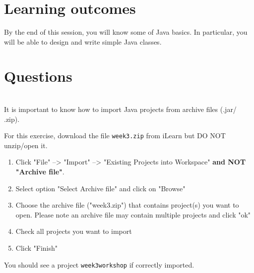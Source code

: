 \section*{Learning outcomes}

By the end of this session, you will know some of Java basics.
In particular, you will be able to design and write simple Java classes.

\section*{Questions}

\begin{questions}

\\
 
It is important to know how to import Java projects from archive files (.jar/ .zip).

For this exercise, download the file \texttt{week3.zip} from iLearn but \color{red}DO NOT unzip/open it\color{black}.

\begin{enumerate}
\item Click "File" --> "Import" --> "Existing Projects into Workspace" \color{red}\textbf{and NOT "Archive file"}\color{black}.
\item Select option "Select Archive file" and click on "Browse"
\item Choose the archive file ("week3.zip") that contains project(s) you want to open. Please note an archive file may contain multiple projects and click "ok"
\item Check all projects you want to import
\item Click "Finish"
\end{enumerate}

You should see a project \texttt{week3workshop} if correctly imported.

%
%


\end{questions}
